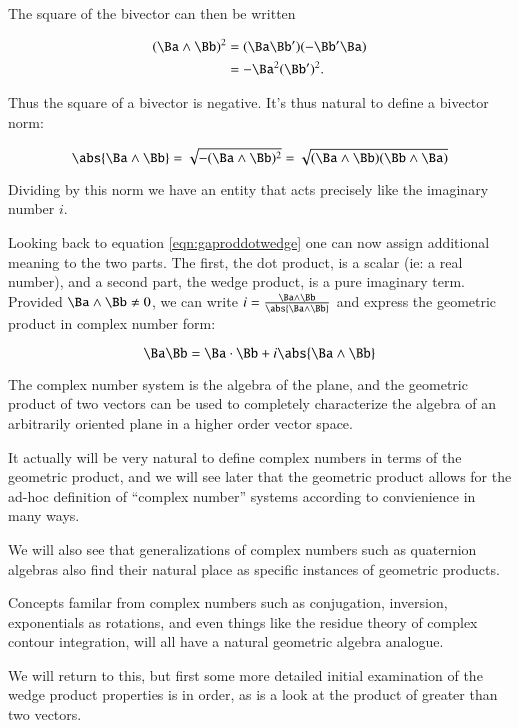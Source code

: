 \documentclass{article}      %
\begin{document}
The square of the bivector can then be written

\begin{align*}
(\Ba \wedge \Bb)^2
&= (\Ba \Bb')(-\Bb'\Ba) \\
&= -\Ba^2 (\Bb')^2.
\end{align*}

Thus the square of a bivector is negative.  It's thus natural to define a 
bivector norm:

\[
\abs{\Ba \wedge \Bb} = \sqrt{-(\Ba \wedge \Bb)^2} = \sqrt{ (\Ba \wedge \Bb)(\Bb \wedge \Ba) }
\]

Dividing by this norm we have an entity that acts precisely like the imaginary number $i$.

Looking back to equation \ref{eqn:gaproddotwedge} one can now assign additional meaning to the two parts.  The first, the dot product, is a scalar (ie: a real number), and a second part, the wedge product, is a pure imaginary term.  Provided $\Ba \wedge \Bb \ne 0$, we can write $i = \frac{\Ba \wedge \Bb}{ \abs{\Ba \wedge \Bb} }$ and express
the geometric product in complex number form:

\[
\Ba \Bb = \Ba \cdot \Bb + i \abs{\Ba \wedge \Bb}
\]

The complex number system
is the algebra of the plane, and the geometric product of two vectors can be used to completely characterize the algebra of an arbitrarily oriented plane in a higher
order vector space.

It actually will be very natural to define complex numbers in terms of the geometric product, and we will see later that
the geometric product allows for the ad-hoc definition of ``complex number'' systems according to convienience in many ways.  

We will also see that generalizations of complex numbers such as quaternion algebras also find their natural place as specific instances of geometric products.

Concepts familar from
complex numbers such as conjugation, inversion, exponentials as rotations, and even things like the residue theory of complex contour integration, will
all have a natural geometric algebra analogue.

We will return to this, but first some more detailed initial examination of the wedge product properties is in order, as is a look at the product of greater than
two vectors.
\end{document}
